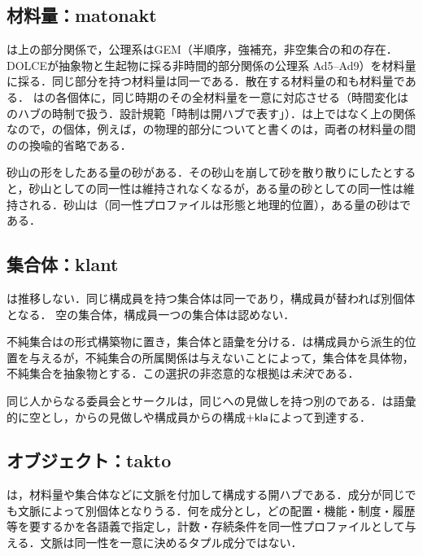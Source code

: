 \documentclass[../../main-detail.tex]{subfiles}
\begin{document}
\subsection{材料量：matonakt}
は上の部分関係で，公理系はGEM（半順序，強補充，非空集合の和の存在．DOLCEが抽象物と生起物に採る非時間的部分関係の公理系 \citet{masolo-etal2003} Ad5--Ad9）を材料量に採る．同じ部分を持つ材料量は同一である．散在する材料量の和も材料量である．
はの各個体に，同じ時期のその全材料量を一意に対応させる（時間変化はのハブの時制で扱う．設計規範「時制は開ハブで表す」）．は上ではなく上の関係なので，の個体，例えば，の物理的部分についてと書くのは，両者の材料量の間のの換喩的省略である．
\begin{example}
砂山の形をしたある量の砂がある．その砂山を崩して砂を散り散りにしたとすると，砂山としての同一性は維持されなくなるが，ある量の砂としての同一性は維持される．砂山は（同一性プロファイルは形態と地理的位置），ある量の砂はである．
\end{example}
\subsection{集合体：klant}
は推移しない．同じ構成員を持つ集合体は同一であり，構成員が替われば別個体となる．
空の集合体，構成員一つの集合体は認めない．
\begin{remark}
    不純集合はの形式構築物に置き，集合体と語彙を分ける．は構成員から派生的位置を与えるが，不純集合の所属関係は与えないことによって，集合体を具体物，不純集合を抽象物とする．この選択の非恣意的な根拠は\emph{未決}である．
\end{remark}
同じ人からなる委員会とサークルは，同じへの見做しを持つ別のである．は語彙的に空とし，からの見做しや構成員からの構成$+\textsf{kla}$によって到達する．
\subsection{オブジェクト：takto}
は，材料量や集合体などに文脈を付加して構成する開ハブである．成分が同じでも文脈によって別個体となりうる．何を成分とし，どの配置・機能・制度・履歴等を要するかを各語義で指定し，計数・存続条件を同一性プロファイルとして与える．文脈は同一性を一意に決めるタプル成分ではない．
\end{document}
